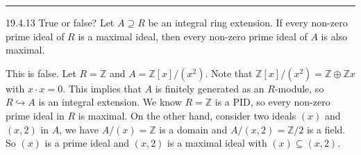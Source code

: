\documentclass[letterpaper, 12pt]{article}
\begin{document}
\noindent\rule{7in}{2.8pt}
\begin{problem}{19.4.13}
True or false? Let \(A\supseteq R\) be an integral ring extension. If every non-zero prime ideal of \(R\) is a maximal ideal, then every non-zero prime ideal of \(A\) is also maximal.
\end{problem}
\begin{solution}
This is false. Let \(R=\mathbb{Z}\) and \(A=\mathbb{Z}[x]/(x^2)\). Note that \(\mathbb{Z}[x]/(x^2)=\mathbb{Z}\oplus \mathbb{Z}x\) with \(x\cdot x=0\). This implies that \(A\) is finitely generated as an \(R\)-module, so \(R\hookrightarrow A\) is an integral extension. We know \(R=\mathbb{Z}\) is a PID, so every non-zero prime ideal in \(R\) is maximal. On the other hand, consider two ideals \((x)\) and \((x,2)\) in \(A\), we have \(A/(x)=\mathbb{Z}\) is a domain and \(A/(x,2)=\mathbb{Z}/2\) is a field. So \((x)\) is a prime ideal and \((x,2)\) is a maximal ideal with \((x)\subseteq (x,2)\). 
\end{solution}
\end{document}
